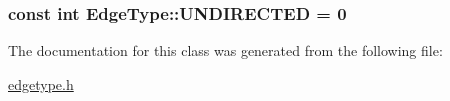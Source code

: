 \subsubsection[{U\+N\+D\+I\+R\+E\+C\+T\+E\+D}]{\setlength{\rightskip}{0pt plus 5cm}const int Edge\+Type\+::\+U\+N\+D\+I\+R\+E\+C\+T\+E\+D = 0\hspace{0.3cm}{\ttfamily [static]}}\label{class_edge_type_a6533cc56d05c288a550b9980b66c9317}


The documentation for this class was generated from the following file\+:\begin{DoxyCompactItemize}
\item 
\hyperlink{edgetype_8h}{edgetype.\+h}\end{DoxyCompactItemize}
